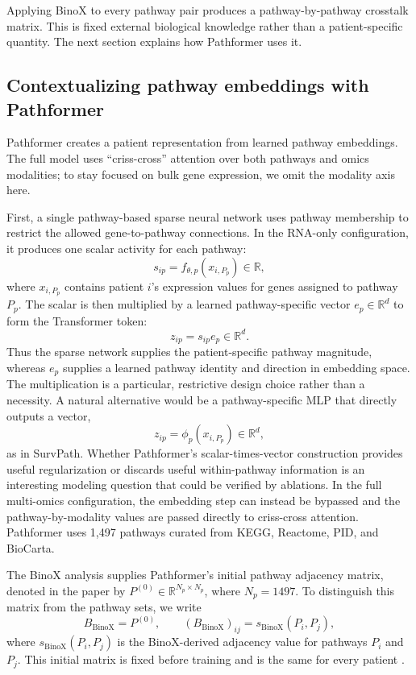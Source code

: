 \documentclass[11pt]{article}
\begin{document}
Applying BinoX to every pathway pair produces a pathway-by-pathway crosstalk
matrix. This is fixed external biological knowledge rather than a
patient-specific quantity. The next section explains how Pathformer uses it.

\subsection{Contextualizing pathway embeddings with Pathformer}

Pathformer \cite{liu2024pathformer} creates a patient representation from
learned pathway embeddings. The full model uses ``criss-cross'' attention over both
pathways and omics modalities; to stay focused on bulk gene expression, we omit
the modality axis here.

First, a single pathway-based sparse neural network uses pathway membership to
restrict the allowed gene-to-pathway connections. In the RNA-only
configuration, it produces one scalar activity for each pathway:
\begin{equation}
    s_{ip}=f_{\theta,p}\!\left(x_{i,P_p}\right)\in\mathbb{R},
\end{equation}
where $x_{i,P_p}$ contains patient $i$'s expression values for genes assigned
to pathway $P_p$. The scalar is then multiplied by a learned
pathway-specific vector $e_p\in\mathbb{R}^{d}$ to form the Transformer token:
\begin{equation}
    z_{ip}=s_{ip}e_p\in\mathbb{R}^{d}.
\end{equation}
Thus the sparse network supplies the patient-specific pathway magnitude,
whereas $e_p$ supplies a learned pathway identity and direction in embedding
space. The multiplication is a particular, restrictive design choice rather
than a necessity. A natural alternative would be a pathway-specific MLP that
directly outputs a vector,
\begin{equation}
    z_{ip}=\phi_p\!\left(x_{i,P_p}\right)\in\mathbb{R}^{d},
\end{equation}
as in SurvPath. Whether Pathformer's scalar-times-vector construction provides
useful regularization or discards useful within-pathway information is an
interesting modeling question that could be verified by ablations. In the full multi-omics configuration, the
embedding step can instead be bypassed and the pathway-by-modality values are
passed directly to criss-cross attention. Pathformer uses 1,497 pathways
curated from KEGG, Reactome, PID, and BioCarta.

The BinoX analysis supplies Pathformer's initial pathway adjacency matrix,
denoted in the paper by $P^{(0)}\in\mathbb{R}^{N_p\times N_p}$, where
$N_p=1497$. To distinguish this matrix from the pathway sets, we write
\begin{equation}
    B_{\mathrm{BinoX}} = P^{(0)},
    \qquad
    (B_{\mathrm{BinoX}})_{ij}
    = s_{\mathrm{BinoX}}(P_i,P_j),
\end{equation}
where $s_{\mathrm{BinoX}}(P_i,P_j)$ is the BinoX-derived adjacency value for
pathways $P_i$ and $P_j$. This initial matrix is fixed before training and is
the same for every patient \cite{liu2024pathformer}.
\end{document}
